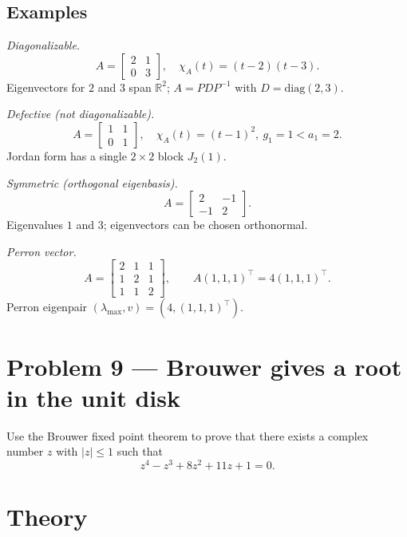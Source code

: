 \documentclass[12pt,a4paper]{article}
\theoremstyle{plain}
\theoremstyle{definition}
\theoremstyle{remark}
\theoremstyle{remark}
\begin{document}
	\smallskip
	
	\subsection*{Examples}
	
	\noindent\emph{Diagonalizable.}
	\[
	A=\begin{bmatrix}2&1\\0&3\end{bmatrix},\quad
	\chi_A(t)=(t-2)(t-3).
	\]
	Eigenvectors for $2$ and $3$ span $\mathbb{R}^2$; $A=PDP^{-1}$ with $D=\mathrm{diag}(2,3)$.
	
	\smallskip
	
	\noindent\emph{Defective (not diagonalizable).}
	\[
	A=\begin{bmatrix}1&1\\0&1\end{bmatrix},\quad
	\chi_A(t)=(t-1)^2,\ g_1=1<a_1=2.
	\]
	Jordan form has a single $2\times2$ block $J_2(1)$.
	
	\smallskip
	
	\noindent\emph{Symmetric (orthogonal eigenbasis).}
	\[
	A=\begin{bmatrix}2&-1\\-1&2\end{bmatrix}.
	\]
	Eigenvalues $1$ and $3$; eigenvectors can be chosen orthonormal.
	
	\smallskip
	
	\noindent\emph{Perron vector.}
	\[
	A=\begin{bmatrix}2&1&1\\1&2&1\\1&1&2\end{bmatrix},\qquad
	A(1,1,1)^\top=4(1,1,1)^\top .
	\]
	Perron eigenpair $(\lambda_{\max},v)=(4,(1,1,1)^\top)$.
	
\section*{Problem 9 --- Brouwer gives a root in the unit disk}

Use the Brouwer fixed point theorem to prove that there exists a complex number $z$ with $|z|\le 1$
such that
\[
z^4 - z^3 + 8z^2 + 11z + 1 = 0.
\]

\bigskip

\section*{Theory}
\end{document}
